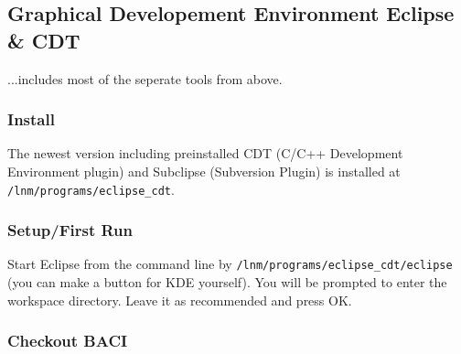 \subsection{Graphical Developement Environment Eclipse \& CDT}

...includes most of the seperate tools from above.

\subsubsection{Install}

The newest version including preinstalled CDT (C/C++ Development Environment plugin) and Subclipse (Subversion Plugin) is installed at \verb|/lnm/programs/eclipse_cdt|.

\subsubsection{Setup/First Run}
Start Eclipse from the command line by \verb|/lnm/programs/eclipse_cdt/eclipse| (you can make a button for KDE yourself).
You will be prompted to enter the workspace directory. Leave it as recommended and press OK.

\subsubsection{Checkout BACI}


